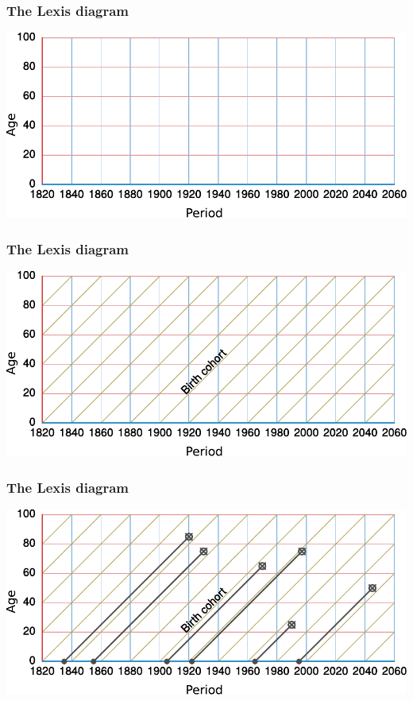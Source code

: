 \documentclass[20pt]{beamer}
\begin{document}
\begin{frame}
\frametitle{The Lexis diagram}
\includegraphics[scale=1.5]{Figures/APCrt1.pdf}\\
\end{frame}

\begin{frame}
\frametitle{The Lexis diagram}
\includegraphics[scale=1.5]{Figures/APCrt2.pdf}\\
\end{frame}

\begin{frame}
\frametitle{The Lexis diagram}
\includegraphics[scale=1.5]{Figures/APCrt3.pdf}\\
\end{frame}
\end{document}
